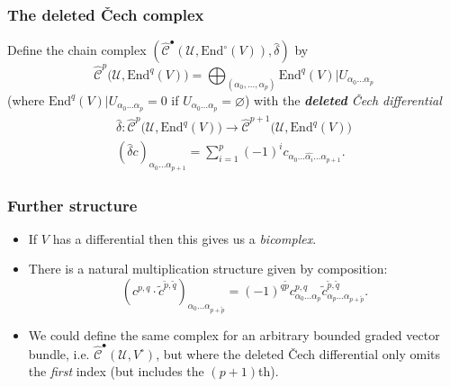 \documentclass{beamer}
\begin{document}
            \begin{frame}\frametitle{The deleted Čech complex}
                \begin{definition}
                    Define the chain complex $(\hat{\mathscr{C}}^\bullet(\mathcal{U},\mathrm{End}^\circ(V)),\hat{\delta})$ by
                    \begin{equation*}
                        \hat{\mathscr{C}}^p\big(\mathcal{U},\mathrm{End}^q(V)\big) = \bigoplus_{(\alpha_0,\ldots,\alpha_p)} \mathrm{End}^q(V)|U_{\alpha_0\ldots\alpha_p}
                    \end{equation*}
                    (where $\mathrm{End}^q(V)|U_{\alpha_0\ldots\alpha_p}=0$ if $U_{\alpha_0\ldots\alpha_p}=\varnothing$) with the \emph{\textbf{deleted} Čech differential}
                    \begin{gather*}
                        \hat{\delta} \colon \hat{\mathscr{C}}^p\big(\mathcal{U},\mathrm{End}^q(V)\big) \to \hat{\mathscr{C}}^{p+1}\big(\mathcal{U},\mathrm{End}^q(V)\big)\\
                        (\hat{\delta}c)_{\alpha_0\ldots\alpha_{p+1}} = \sum_{i=1}^p (-1)^i c_{\alpha_0\ldots\widehat{\alpha_i}\ldots\alpha_{p+1}}.
                    \end{gather*}
                \end{definition}
            \end{frame}

            \begin{frame}\frametitle{Further structure}
                \begin{itemize}
                    \item If $V$ has a differential then this gives us a \emph{bicomplex}.
                    \pause
                    \item There is a natural multiplication structure given by composition:
                        \begin{equation*}
                            (c^{p,q}\cdot \tilde{c}^{\tilde{p},\tilde{q}})_{\alpha_0\ldots\alpha_{p+\tilde{p}}} = (-1)^{q\tilde{p}} c_{\alpha_0\ldots\alpha_p}^{p,q} \tilde{c}_{\alpha_p\ldots\alpha_{p+\tilde{p}}}^{\tilde{p},\tilde{q}}.
                        \end{equation*}
                    \pause
                    \item We could define the same complex for an arbitrary bounded graded vector bundle, i.e. $\hat{\mathscr{C}}^\bullet(\mathcal{U},V^\circ)$, but where the deleted Čech differential only omits the \emph{first} index (but includes the $(p+1)$th).
                \end{itemize}
            \end{frame}
\end{document}
